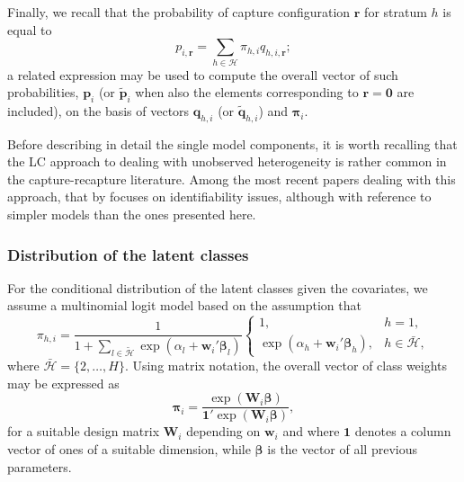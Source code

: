 Finally, we recall that the probability of capture configuration $\bm{r}$ for stratum $h$ is equal to
\[
p_{i,\bm{r}} = \sum_{h\in\mathcal{H}} \pi_{h,i}q_{h,i,\bm{r}};
\]
a related expression may be used to compute the overall vector of such probabilities, $\bm{p}_i$ (or $\tilde{\bm{p}}_i$ when also the elements corresponding to $\bm{r}=\bm{0}$ are included), on the basis of vectors $\bm{q}_{h,i}$ (or $\tilde{\bm{q}}_{h,i}$) and $\bm\pi_i$.

Before describing in detail the single model components, it is worth recalling that the LC approach to dealing with unobserved heterogeneity is rather common in the capture-recapture literature.
Among the most recent papers dealing with this approach, that by \cite{aleshin2024central} focuses on identifiability issues, although with reference to simpler models than the ones presented here.
%
\subsubsection{Distribution of the latent classes}
%
For the conditional distribution of the latent classes given the covariates, we assume a multinomial logit model based on the assumption that
\[
\pi_{h,i} = \frac{1}{1+\sum_{l\in\tilde{\mathcal{H}}}\exp(\alpha_l+\bm{w}_i'\bm{\beta}_l)}
\left\{
\begin{array}{ll}
1, & h=1,\\
\exp(\alpha_h+\bm{w}_i'\bm{\beta}_h) ,& h\in\bar{\mathcal{H}},
\end{array}
\right.
\]
where $\bar{\mathcal{H}}=\{2,\ldots,H\}$.
Using matrix notation, the overall vector of class weights may be expressed as
\[
\bm{\pi}_i = \frac{\exp(\bm{W}_i\bm{\beta})}{\bm{1}'\exp(\bm{W}_i\bm{\beta})},
\]
for a suitable design matrix $\bm{W}_i$ depending on $\bm{w}_i$ and where $\bm{1}$ denotes a column vector of ones of a suitable dimension, while $\bm{\beta}$ is the vector of all previous parameters.
%
